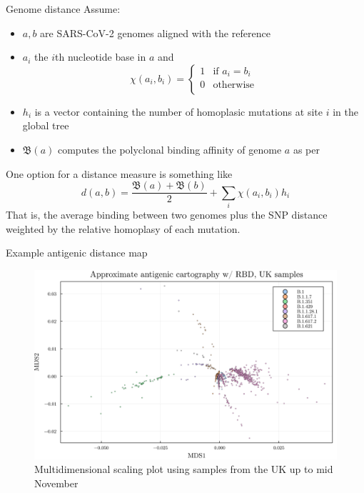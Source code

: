 \documentclass{beamer}
\begin{document}
\begin{frame}{Genome distance}
    Assume:
    \begin{itemize}
        \item $a,b$ are SARS-CoV-2 genomes aligned with the reference
        \item $a_i$ the $i$th nucleotide base in $a$ and
         \[
            \chi(a_i,b_i) =   \begin{cases}
            1 & \text{if $a_i=b_i$} \\
            0 & \text{otherwise} \\
        \end{cases}
        \]
        \item $h_i$ is a vector containing the number of homoplasic mutations at site $i$ in the global tree
        \item $\mathfrak{B}(a)$ computes the polyclonal binding affinity of genome $a$ as per \cite{starr2020deep}
    \end{itemize}
        
    One option for a distance measure is something like
    \begin{equation}
        d(a,b) = \frac{\mathfrak{B}(a) + \mathfrak{B}(b)}{2} + \sum_i \chi(a_i,b_i) h_i
    \end{equation}
    That is, the average binding between two genomes plus the SNP distance weighted by the relative homoplasy of each mutation.
\end{frame}
\begin{frame}{Example antigenic distance map}
    \begin{figure}
        \includegraphics[width=\textwidth]{uk_multidimensional_scaling.png}
        \caption{Multidimensional scaling plot using samples from the UK up to mid November}
    \end{figure}
\end{frame}
\end{document}
